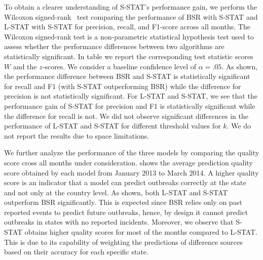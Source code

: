 \documentclass[conference]{IEEEtran}
\newcommand{\fullmodel}{{S-STAT}\xspace}
\newcommand{\locationmodel}{{L-STAT}\xspace}
\begin{document}
To obtain a clearer understanding of \fullmodel's performance gain, we perform the Wilcoxon signed-rank~\cite{Wilcoxon45} test comparing the performance of  BSR with \fullmodel and \locationmodel with \fullmodel for precision, recall, and F1-score across all months. The Wilcoxon signed-rank test is a non-parametric statistical hypothesis test used to assess whether the performance differences between two algorithms are statistically significant. In table  we report the corresponding test statistic scores $W$ and the $z$-scores. We consider a baseline confidence level of $\alpha = .05$. As shown, the performance difference between BSR and \fullmodel is statistically significant for recall and F1 (with \fullmodel outperforming BSR) while the difference for precision is not statistically significant. For \locationmodel and \fullmodel, we see that the performance gain of \fullmodel for precision and F1 is statistically significant while the difference for recall is not. We did not observe significant differences in the performance of \locationmodel and \fullmodel for different threshold values for $k$. We do not report the results due to space limitations.

We further analyze the performance of the three models by comparing the quality score cross all months under consideration.  shows the average prediction quality score obtained by each model from January 2013 to March 2014. A higher quality score is an indicator that a model can predict outbreaks correctly at the state and not only at the country level. As shown, both \locationmodel and \fullmodel outperform BSR significantly. This is expected since BSR relies only on past reported events to predict future outbreaks, hence, by design it cannot predict outbreaks in states with no reported incidents. Moreover, we observe that \fullmodel obtains higher quality scores for most of the months compared to \locationmodel. This is due to its capability of weighting the predictions of difference sources  based on their accuracy for each specific state.
\end{document}
